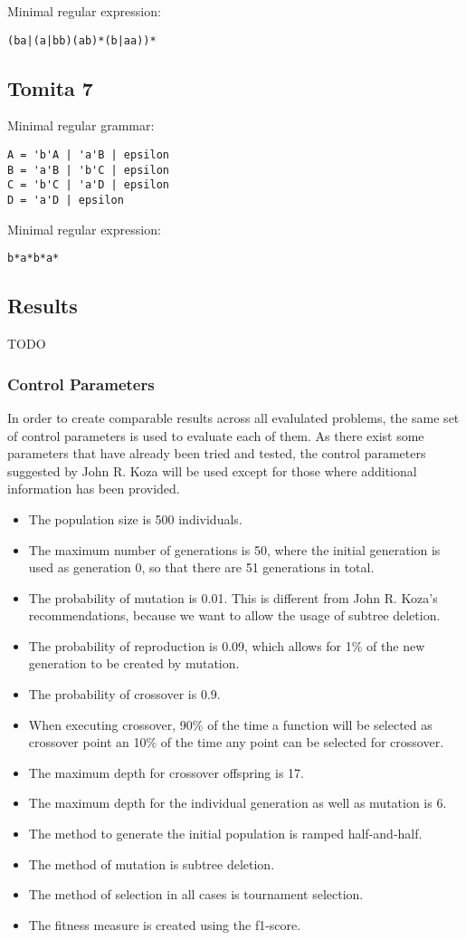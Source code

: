 \documentclass[runningheads]{llncs}
\begin{document}
Minimal regular expression:
\begin{verbatim}
(ba|(a|bb)(ab)*(b|aa))*
\end{verbatim}

\subsection{Tomita 7}
\label{sec:orgdc905df}
Minimal regular grammar:
\begin{verbatim}
A = 'b'A | 'a'B | epsilon
B = 'a'B | 'b'C | epsilon
C = 'b'C | 'a'D | epsilon
D = 'a'D | epsilon
\end{verbatim}

Minimal regular expression:
\begin{verbatim}
b*a*b*a*
\end{verbatim}

\subsection{Results}
TODO

\subsubsection{Control Parameters}
In order to create comparable results across all evalulated problems, the same set of control parameters is used to evaluate each of them. As there exist some parameters that have already been tried and tested, the control parameters suggested by John R. Koza will be used except for those where additional information has been provided.
\begin{itemize}
\item The population size is 500 individuals.
\item The maximum number of generations is 50, where the initial generation is used as generation 0, so that there are 51 generations in total.
\item The probability of mutation is 0.01. This is different from John R. Koza's recommendations, because we want to allow the usage of subtree deletion.
\item The probability of reproduction is 0.09, which allows for 1\% of the new generation to be created by mutation.
\item The probability of crossover is 0.9.
\item When executing crossover, 90\% of the time a function will be selected as crossover point an 10\% of the time any point can be selected for crossover.
\item The maximum depth for crossover offspring is 17.
\item The maximum depth for the individual generation as well as mutation is 6.
\item The method to generate the initial population is ramped half-and-half.
\item The method of mutation is subtree deletion.
\item The method of selection in all cases is tournament selection.
\item The fitness measure is created using the f1-score.
\cite[114]{gp1-1993}
\end{itemize}
\end{document}
